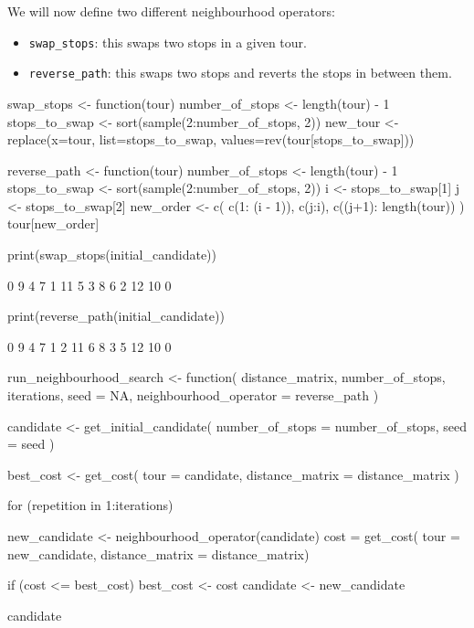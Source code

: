 We will now define two different neighbourhood operators:

\begin{itemize}
    \item \texttt{swap_stops}: this swaps two stops in a given tour.
    \item \texttt{reverse_path}: this swaps two stops and reverts the
        stops in between them.
\end{itemize}

\begin{Rin}
swap_stops <- function(tour){
    number_of_stops <- length(tour) - 1
    stops_to_swap <- sort(sample(2:number_of_stops, 2))
    new_tour <- replace(x=tour,
                        list=stops_to_swap,
                        values=rev(tour[stops_to_swap]))
    }

reverse_path <- function(tour){
    number_of_stops <- length(tour) - 1
    stops_to_swap <- sort(sample(2:number_of_stops, 2))
    i <- stops_to_swap[1]
    j <- stops_to_swap[2]
    new_order <- c(
            c(1: (i - 1)),
            c(j:i),
            c((j+1): length(tour))
            )
    tour[new_order]
    }
\end{Rin}

\begin{Rin}
print(swap_stops(initial_candidate))
\end{Rin}

\begin{Rout}
 [1]  0  9  4  7  1 11  5  3  8  6  2 12 10  0
\end{Rout}

\begin{Rin}
print(reverse_path(initial_candidate))
\end{Rin}

\begin{Rout}
 [1]  0  9  4  7  1  2 11  6  8  3  5 12 10  0
\end{Rout}

\begin{Rin}
run_neighbourhood_search <- function(
  distance_matrix,
  number_of_stops,
  iterations,
  seed = NA,
  neighbourhood_operator = reverse_path
){
  candidate <- get_initial_candidate(
    number_of_stops = number_of_stops,
    seed = seed
    )

  best_cost <- get_cost(
    tour = candidate,
    distance_matrix = distance_matrix
    )

  for (repetition in 1:iterations) {
    new_candidate <- neighbourhood_operator(candidate)
    cost = get_cost(
        tour = new_candidate,
        distance_matrix = distance_matrix)

    if (cost <= best_cost) {
      best_cost <- cost
      candidate <- new_candidate
    }

  }
  candidate
}
\end{Rin}

